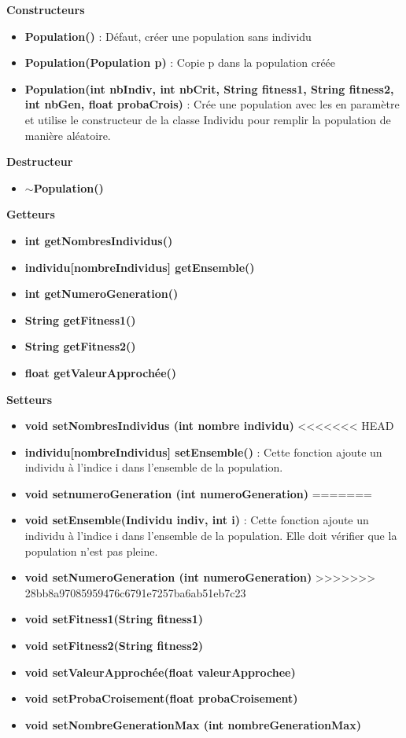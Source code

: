 \documentclass[a4paper,11pt]{article}
\begin{document}
			\textbf{Constructeurs}
						\begin{itemize}
							\item \textbf{Population()} : Défaut, créer une population sans individu
							\item \textbf{Population(Population p)} : Copie p dans la population créée
							\item \textbf{Population(int nbIndiv, int nbCrit, String fitness1, String fitness2, int nbGen, float probaCrois)} : Crée une population avec les en paramètre et utilise le constructeur de la classe Individu pour remplir la population de manière aléatoire. \\
						\end{itemize}
			\textbf{Destructeur}
					\begin{itemize}
							\item \textbf{$\sim$Population()}\\
					\end{itemize}
			\textbf{Getteurs}
					\begin{itemize}
							\item \textbf{int getNombresIndividus()}
							\item \textbf{individu[nombreIndividus] getEnsemble()}
							\item \textbf{int getNumeroGeneration()}
							\item \textbf{String getFitness1()}
							\item \textbf{String getFitness2()}
							\item \textbf{float getValeurApprochée()}\\
					\end{itemize}
			\textbf{Setteurs}
					\begin{itemize}
							\item \textbf{void setNombresIndividus (int nombre individu)}
<<<<<<< HEAD
							\item \textbf{individu[nombreIndividus] setEnsemble()} : Cette fonction ajoute un individu à l’indice i dans l’ensemble de la population.
							\item \textbf{void setnumeroGeneration (int numeroGeneration)}
=======
							\item \textbf{void setEnsemble(Individu indiv, int i)} : Cette fonction ajoute un individu à l’indice i dans l’ensemble de la population.
																			Elle doit vérifier que la population n’est pas pleine.
							\item \textbf{void setNumeroGeneration (int numeroGeneration)}
>>>>>>> 28bb8a97085959476c6791e7257ba6ab51eb7c23
							\item \textbf{void setFitness1(String fitness1)}
							\item \textbf{void setFitness2(String fitness2)}
							\item \textbf{void setValeurApprochée(float valeurApprochee)}
							\item \textbf{void setProbaCroisement(float probaCroisement)}
							\item \textbf{void setNombreGenerationMax (int nombreGenerationMax)}\\
					\end{itemize}
\end{document}

